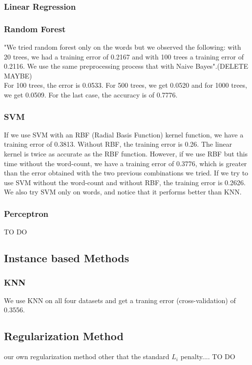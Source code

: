 \documentclass[11pt,twocolumn]{report}
\begin{document}
    \subsubsection{Linear Regression}
    
    
     \subsubsection{Random Forest}
     "We tried random forest only on the words but we observed the following: with 20 trees, we had a training error of 0.2167 and with 100 trees a training error of 0.2116. We use the same preprocessing process that with Naive Bayes".(DELETE MAYBE)\\
     For 100 trees, the error is 0.0533. For 500 trees, we get 0.0520 and for 1000 trees, we get 0.0509. For the last case, the accuracy is of 0.7776.
    \subsubsection{SVM}
    
    If we use SVM with an RBF (Radial Basis Function) kernel function, we have a training error of 0.3813. Without RBF, the training error is 0.26. The linear kernel is twice as accurate as the RBF function. However, if we use RBF but this time without the word-count, we have a training error of 0.3776, which is greater than the error obtained with the two previous combinations we tried. If we try to use SVM without the word-count and without RBF, the training error is 0.2626. We also try SVM only on words, and notice that it performs better than KNN.
    
    \subsubsection*{Perceptron}
    TO DO
    \subsection*{Instance based Methods}
    \subsubsection{KNN}
    
    We use KNN on all four datasets and get a traning error (cross-validation) of 0.3556.
   
    \subsection*{Regularization Method}
    our own regularization method other that the standard $L_i$ penalty....
    TO DO
\end{document}
